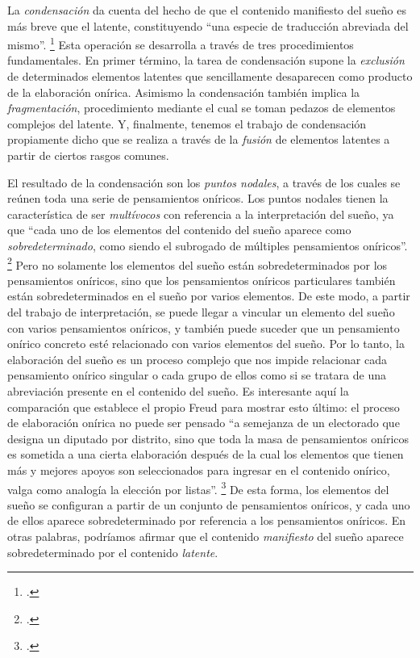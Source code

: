 La \emph{condensación} da cuenta del hecho de que el contenido manifiesto del sueño es más breve que el latente, constituyendo \enquote{una especie de traducción abreviada del mismo}. \footcite[][184]{@7032-FREUD1969} Esta operación se desarrolla a través de tres procedimientos fundamentales. En primer término, la tarea de condensación supone la \emph{exclusión} de determinados elementos latentes que sencillamente desaparecen como producto de la elaboración onírica. Asimismo la condensación también implica la \emph{fragmentación}, procedimiento mediante el cual se toman pedazos de elementos complejos del latente. Y, finalmente, tenemos el trabajo de condensación propiamente dicho que se realiza a través de la \emph{fusión} de elementos latentes a partir de ciertos rasgos comunes.

El resultado de la condensación son los \emph{puntos nodales}, a través de los cuales se reúnen toda una serie de pensamientos oníricos. Los puntos nodales tienen la característica de ser \emph{multívocos} con referencia a la interpretación del sueño, ya que \enquote{cada uno de los elementos del contenido del sueño aparece como \emph{sobredeterminado}, como siendo el subrogado de múltiples pensamientos oníricos}. \footcite[][291]{@7031-FREUD2008} Pero no solamente los elementos del sueño están sobredeterminados por los pensamientos oníricos, sino que los pensamientos oníricos particulares también están sobredeterminados en el sueño por varios elementos. De este modo, a partir del trabajo de interpretación, se puede llegar a vincular un elemento del sueño con varios pensamientos oníricos, y también puede suceder que un pensamiento onírico concreto esté relacionado con varios elementos del sueño. Por lo tanto, la elaboración del sueño es un proceso complejo que nos impide relacionar cada pensamiento onírico singular o cada grupo de ellos como si se tratara de una abreviación presente en el contenido del sueño. Es interesante aquí la comparación que establece el propio Freud para mostrar esto último: el proceso de elaboración onírica no puede ser pensado \enquote{a semejanza de un electorado que designa un diputado por distrito, sino que toda la masa de pensamientos oníricos es sometida a una cierta elaboración después de la cual los elementos que tienen más y mejores apoyos son seleccionados para ingresar en el contenido onírico, valga como analogía la elección por listas}. \footcite[][292]{@7031-FREUD2008} De esta forma, los elementos del sueño se configuran a partir de un conjunto de pensamientos oníricos, y cada uno de ellos aparece sobredeterminado por referencia a los pensamientos oníricos. En otras palabras, podríamos afirmar que el contenido \emph{manifiesto} del sueño aparece sobredeterminado por el contenido \emph{latente}.

